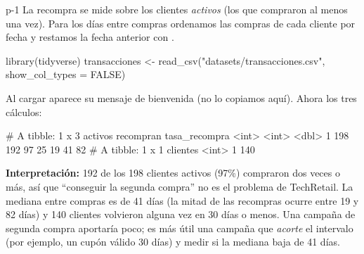 
\begin{solucion}{p-1}
La recompra se mide sobre los clientes \emph{activos} (los que compraron al
menos una vez). Para los días entre compras ordenamos las compras de cada
cliente por fecha y restamos la fecha anterior con .
\end{solucion}

\begin{rcode}
library(tidyverse)
transacciones <- read_csv("datasets/transacciones.csv",
                          show_col_types = FALSE)
\end{rcode}

Al cargar  aparece su mensaje de bienvenida (no lo
copiamos aquí). Ahora los tres cálculos:


\begin{rsalida}
# A tibble: 1 x 3
  activos recompran tasa_recompra
    <int>     <int>         <dbl>
1     198       192            97
25%
 19  41  82 
# A tibble: 1 x 1
  clientes
     <int>
1      140
\end{rsalida}

\textbf{Interpretación:} 192 de los 198 clientes activos (97\%) compraron
dos veces o más, así que ``conseguir la segunda compra'' no es el problema de
TechRetail. La mediana entre compras es de 41 días (la mitad de las
recompras ocurre entre 19 y 82 días) y 140 clientes volvieron alguna vez en
30 días o menos. Una campaña de segunda compra aportaría poco; es más útil
una campaña que \emph{acorte} el intervalo (por ejemplo, un cupón válido 30
días) y medir si la mediana baja de 41 días.


